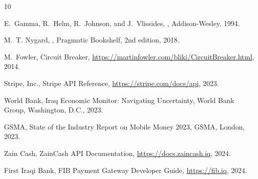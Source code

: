 \documentclass[preprint,12pt]{elsarticle}
\begin{document}
\begin{thebibliography}{10}

E.~Gamma, R.~Helm, R.~Johnson, and J.~Vlissides,
,
\newblock Addison-Wesley, 1994.

M.~T. Nygard,
,
\newblock Pragmatic Bookshelf, 2nd edition, 2018.

M.~Fowler,
\newblock Circuit Breaker,
\newblock \url{https://martinfowler.com/bliki/CircuitBreaker.html}, 2014.

Stripe, Inc.,
\newblock Stripe API Reference,
\newblock \url{https://stripe.com/docs/api}, 2023.

World Bank,
\newblock Iraq Economic Monitor: Navigating Uncertainty,
\newblock World Bank Group, Washington, D.C., 2023.

GSMA,
\newblock State of the Industry Report on Mobile Money 2023,
\newblock GSMA, London, 2023.

Zain Cash,
\newblock ZainCash API Documentation,
\newblock \url{https://docs.zaincash.iq}, 2024.

First Iraqi Bank,
\newblock FIB Payment Gateway Developer Guide,
\newblock \url{https://fib.iq}, 2024.

\end{thebibliography}
\end{document}
